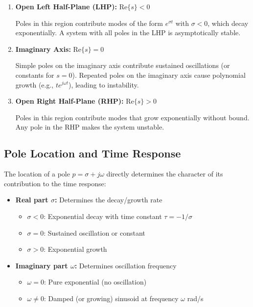 \begin{enumerate}
    \item \textbf{Open Left Half-Plane (LHP):} $\text{Re}\{s\} < 0$

    Poles in this region contribute modes of the form $e^{\sigma t}$ with $\sigma < 0$, which decay exponentially. A system with all poles in the LHP is asymptotically stable.

    \item \textbf{Imaginary Axis:} $\text{Re}\{s\} = 0$

    Simple poles on the imaginary axis contribute sustained oscillations (or constants for $s = 0$). Repeated poles on the imaginary axis cause polynomial growth (e.g., $te^{j\omega t}$), leading to instability.

    \item \textbf{Open Right Half-Plane (RHP):} $\text{Re}\{s\} > 0$

    Poles in this region contribute modes that grow exponentially without bound. Any pole in the RHP makes the system unstable.
\end{enumerate}

\subsection{Pole Location and Time Response}

The location of a pole $p = \sigma + j\omega$ directly determines the character of its contribution to the time response:

\begin{itemize}
    \item \textbf{Real part $\sigma$:} Determines the decay/growth rate
    \begin{itemize}
        \item $\sigma < 0$: Exponential decay with time constant $\tau = -1/\sigma$
        \item $\sigma = 0$: Sustained oscillation or constant
        \item $\sigma > 0$: Exponential growth
    \end{itemize}

    \item \textbf{Imaginary part $\omega$:} Determines oscillation frequency
    \begin{itemize}
        \item $\omega = 0$: Pure exponential (no oscillation)
        \item $\omega \neq 0$: Damped (or growing) sinusoid at frequency $\omega$ rad/s
    \end{itemize}
\end{itemize}

